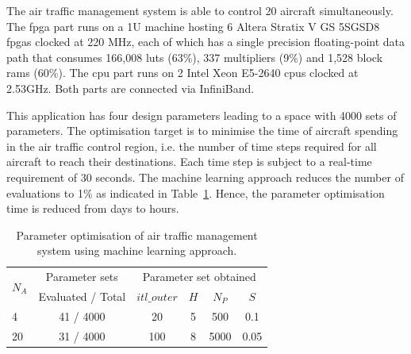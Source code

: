 The air traffic management system is able to control 20 aircraft simultaneously.
The \gls{fpga} part runs on a 1U machine hosting 6 Altera Stratix V GS 5SGSD8 \glspl{fpga} clocked at 220 MHz, 
each of which has a single precision floating-point data path that consumes 166,008 \glspl{lut} (63\%), 337 multipliers (9\%) and 1,528 block \glspl{ram} (60\%).
The \gls{cpu} part runs on 2 Intel Xeon E5-2640 \glspl{cpu} clocked at 2.53GHz.
Both parts are connected via InfiniBand.

This application has four design parameters leading to a space with 4000 sets of parameters.
The optimisation target is to minimise the time of aircraft spending in the air traffic control region,
i.e. the number of time steps required for all aircraft to reach their destinations.
Each time step is subject to a real-time requirement of 30 seconds.
The machine learning approach reduces the number of evaluations to 1\% as indicated in Table~\ref{tab:dse}.
Hence, the parameter optimisation time is reduced from days to hours.

\begin{table}[ht]
	\begin{spacing}{1.0}
	\caption{Parameter optimisation of air traffic management system using machine learning approach.}
	\label{tab:dse}
	\centering
	\smallskip
	\begin{threeparttable}
		\begin{tabular}{l|c|c c c c}
			\hline
			\multirow{2}{*}{$N_A$}			& Parameter	sets		& \multicolumn{4}{|c}{Parameter set obtained} \\
			\cline{3-6}
																	& Evaluated / Total					& $itl\_outer$  		& $H$ & $N_P$ & $S$ \\
			\hline
			\hline
			4 													& 41 / 4000											& 20								&	5		&	500	  & 0.1 \\
			20													& 31 / 4000 											& 100								&	8		&	5000	& 0.05 \\
			\hline
		\end{tabular}
	\end{threeparttable}
	\end{spacing}
\end{table}

